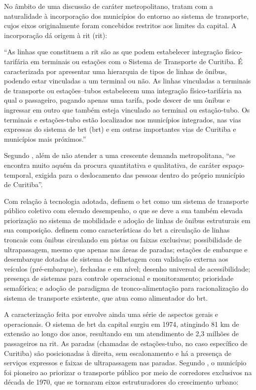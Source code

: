 	No âmbito de uma discussão de caráter metropolitano,  tratam com a naturalidade à incorporação dos municípios do entorno ao sistema de transporte, cujos eixos originalmente foram concebidos restritos aos limites da capital. A incorporação dá origem à \glsdesc{rit} (\gls{rit}):
	
	\begin{citacao}
		``As linhas que constituem a \gls{rit} são as que podem estabelecer integração físico-tarifária em terminais ou estações com o Sistema de Transporte de Curitiba. É caracterizada por apresentar uma hierarquia de tipos de linhas de ônibus, podendo estar vinculadas a um terminal ou não. As linhas vinculadas a terminais de transporte ou estações--tubos estabelecem uma integração físico-tarifária na qual o passageiro, pagando apenas uma tarifa, pode descer de um ônibus e ingressar em outro que também esteja vinculado ao terminal ou estação-tubo. Os terminais e estações-tubo estão localizados nos municípios integrados, nas vias expressas do sistema de \glsdesc{brt} (\gls{brt}) e em outras importantes vias de Curitiba e municípios mais próximos.'' \cite[p. 376]{paese2014a}
	\end{citacao}
	
	Segundo , além de não atender a uma crescente demanda metropolitana, ``se encontra muito aquém da procura quantitativa e qualitativa, de caráter espaço-temporal, exigida para o deslocamento das pessoas dentro do próprio município de Curitiba''.
	
	Com relação à tecnologia adotada,  definem o \gls{brt} como um sistema de transporte público coletivo com elevado desempenho, o que se deve a sua também elevada priorização no sistema de mobilidade e adoção de linhas de ônibus estruturais em sua composição.  definem como características do \gls{brt} a circulação de linhas troncais com ônibus circulando em pistas ou faixas exclusivas; possibilidade de ultrapassagem, mesmo que apenas nas áreas de paradas; estações de embarque e desembarque dotadas de sistema de bilhetagem com validação externa aos veículos (pré-embarque), fechadas e em nível; desenho universal de acessibilidade; presença de sistemas para controle operacional e monitoramento; prioridade semafórica; e adoção de paradigma de tronco-alimentação para racionalização do sistema de transporte existente, que atua como alimentador do \gls{brt}.
	
	A caracterização feita por  envolve ainda uma série de aspectos gerais e operacionais. O sistema de \glsdesc{brt} da capital surgiu em 1974, atingindo 81 km de extensão ao longo dos anos, resultando em um atendimento de 2,3 milhões de passageiros na \gls{rit}. As paradas (chamadas de estações-tubo, no caso específico de Curitiba) são posicionadas à direita, sem escalonamento e há a presença de serviços expressos e faixas de ultrapassagem nas paradas. Segundo , o município foi pioneiro ao priorizar o transporte público por meio de corredores exclusivos na década de 1970, que se tornaram eixos estruturadores do crescimento urbano:
	
